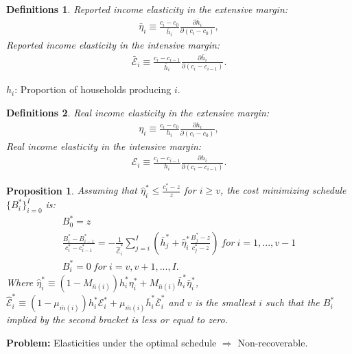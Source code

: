 \documentclass[xcolor=pdftex,dvipsnames,table]{beamer}
\newtheorem{prop}{Proposition}
\newtheorem{defin}{Definitions}
\begin{document}
\begin{frame}[label=elasticities]
\begin{defin}
	Reported income elasticity in the extensive margin:
	\begin{align*}
	\bar{\eta}_i \equiv \frac{c_i-c_0}{\bar{h}_i}\frac{\partial \bar{h}_i}{\partial (c_i-c_0)},
\end{align*}
Reported income elasticity in the intensive margin:
\begin{align*}
	\bar{\mathcal{E}}_i \equiv \frac{c_i-c_{i-1}}{\bar{h}_i}\frac{\partial \bar{h}_i}{\partial (c_i-c_{i-1})}.
\end{align*}
\end{defin}
\end{frame}

\begin{frame}
$h_i$: Proportion of households producing $i$.
\begin{defin}
	Real income elasticity in the extensive margin:
	\begin{align*}
	\eta_i \equiv \frac{c_i-c_0}{h_i}\frac{\partial h_i}{\partial (c_i-c_0)},
\end{align*}
Real income elasticity in the intensive margin:
\begin{align*}
	\mathcal{E}_i \equiv \frac{c_i-c_{i-1}}{h_i}\frac{\partial h_i}{\partial (c_i-c_{i-1})}.
\end{align*}
\end{defin}
\hyperlink{implications}{}
\end{frame}

\begin{frame}[label=prop_imp]
\begin{prop}
	\label{prop_imp_tra}
	Assuming that $\hat{\eta}^{*}_i\leq \frac{c^*_i-z}{z}$ for $i\geq v$, the cost minimizing schedule $\{B^*_i\}_{i=0}^I$ is: 
	\begin{align*}
	B_0^* = z \nonumber\\		
	\frac{B_i^*-B_{i-1}^*}{c^*_i-c^*_{i-1}}=-\frac{1}{\hat{\mathcal{E}}^*_i}\sum_{j=i}^{I}\left(\bar{h}^*_j+\hat{\eta}^*_i\frac{B_j^*-z}{c^*_j-z}\right)\	 for\ i =1,...,v-1  \nonumber\\
	B^*_i = 0\ for\ i = v, v+1, ...,I. \nonumber
	\end{align*}
	Where $\hat{\eta}^*_i\equiv(1-M_{\bar{n}(i)})h^*_i\eta^{*}_i+M_{\bar{n}(i)}\bar{h}^*_i\bar{\eta}^*_i$, 
	$\hat{\mathcal{E}}^*_i\equiv(1-\mu_{\bar{m}(i)})h^*_i\mathcal{E}^{*}_i+\mu_{\bar{m}(i)}\bar{h}^*_i\bar{\mathcal{E}}^*_i$ and $v$ is the smallest $i$ such that the $B^*_i$ implied by the second bracket is less or equal to zero. 
\end{prop}
\hyperlink{implications}{}
\hyperlink{proof_main}{}
\hyperlink{lemma}{}
\hyperlink{welfare}{}
\hyperlink{efficiency}{}
\begin{block}

\textbf{Problem:} Elasticities under the optimal schedule $\Rightarrow$ Non-recoverable.
\end{block}
\end{frame}
\end{document}
